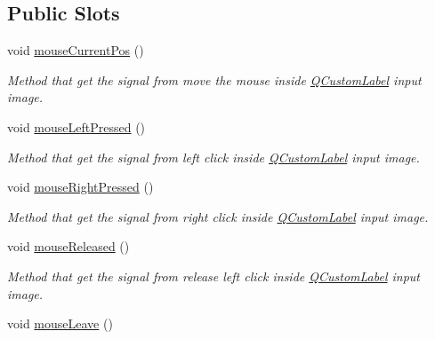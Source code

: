\subsection*{Public Slots}
\begin{DoxyCompactItemize}
\item 
void \hyperlink{classMainWindow_a8501942bff62e974d8b4565257538c0f}{mouse\-Current\-Pos} ()
\begin{DoxyCompactList}\small\item\em Method that get the signal from move the mouse inside \hyperlink{classQCustomLabel}{Q\-Custom\-Label} input image. \end{DoxyCompactList}\item 
void \hyperlink{classMainWindow_a638cd98f8b593e868829541f2b9f6b63}{mouse\-Left\-Pressed} ()
\begin{DoxyCompactList}\small\item\em Method that get the signal from left click inside \hyperlink{classQCustomLabel}{Q\-Custom\-Label} input image. \end{DoxyCompactList}\item 
void \hyperlink{classMainWindow_ab78b5ef982f3e4d7613a03a9da6fb987}{mouse\-Right\-Pressed} ()
\begin{DoxyCompactList}\small\item\em Method that get the signal from right click inside \hyperlink{classQCustomLabel}{Q\-Custom\-Label} input image. \end{DoxyCompactList}\item 
\hypertarget{classMainWindow_a089e5ff94a64d40dabe0a6eb36cc08f8}{void \hyperlink{classMainWindow_a089e5ff94a64d40dabe0a6eb36cc08f8}{mouse\-Released} ()}\label{classMainWindow_a089e5ff94a64d40dabe0a6eb36cc08f8}

\begin{DoxyCompactList}\small\item\em Method that get the signal from release left click inside \hyperlink{classQCustomLabel}{Q\-Custom\-Label} input image. \end{DoxyCompactList}\item 
\hypertarget{classMainWindow_a0b3abf28e1dab2b5321f1e53adb8b8c4}{void \hyperlink{classMainWindow_a0b3abf28e1dab2b5321f1e53adb8b8c4}{mouse\-Leave} ()}\label{classMainWindow_a0b3abf28e1dab2b5321f1e53adb8b8c4}


\end{DoxyCompactItemize}
